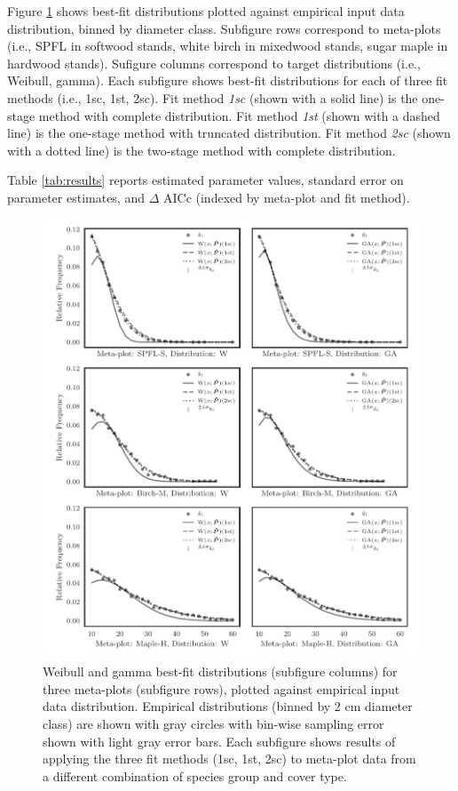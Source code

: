 \documentclass{article}
\begin{document}
  Figure \ref{fig:results} shows best-fit distributions plotted against empirical input data distribution, binned by diameter class.
  Subfigure rows correspond to meta-plots (i.e., SPFL in softwood stands, white birch in mixedwood stands, sugar maple in hardwood stands).
  Sufigure columns correspond to target distributions (i.e., Weibull, gamma).
  Each subfigure shows best-fit distributions for each of three fit methods (i.e., 1sc, 1st, 2sc).
  Fit method \emph{1sc} (shown with a solid line) is the one-stage method with complete distribution.
  Fit method \emph{1st} (shown with a dashed line) is the one-stage method with truncated distribution.
  Fit method \emph{2sc} (shown with a dotted line) is the two-stage method with complete distribution.
  
  Table \ref{tab:results} reports estimated parameter values, standard error on parameter estimates, and $\Delta$ AICc (indexed by meta-plot and fit method).

  \begin{figure}[h!]
    \centering
    \includegraphics[width=1.0\textwidth]{images/results}
    \caption{Weibull and gamma best-fit distributions (subfigure columns) for three meta-plots (subfigure rows), plotted against empirical input data distribution. Empirical distributions (binned by 2 cm diameter class) are shown with gray circles with bin-wise sampling error shown with light gray error bars.  Each subfigure shows results of applying the three fit methods (1sc, 1st, 2sc) to meta-plot data from a different combination of species group and cover type.}
  \label{fig:results}
\end{figure}
\end{document}
